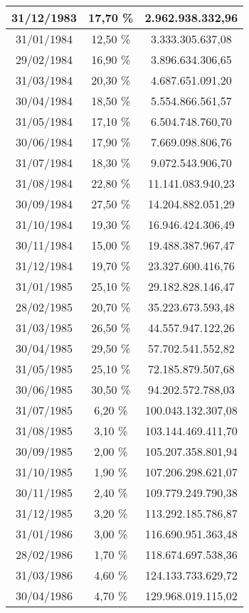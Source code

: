 \begin{center}
\begin{longtable}{|c|c|c|}
31/12/1983 & 17,70 \% & 2.962.938.332,96  \\ \hline
31/01/1984 & 12,50 \% & 3.333.305.637,08  \\ \hline
29/02/1984 & 16,90 \% & 3.896.634.306,65  \\ \hline
31/03/1984 & 20,30 \% & 4.687.651.091,20  \\ \hline
30/04/1984 & 18,50 \% & 5.554.866.561,57  \\ \hline
31/05/1984 & 17,10 \% & 6.504.748.760,70  \\ \hline
30/06/1984 & 17,90 \% & 7.669.098.806,76  \\ \hline
31/07/1984 & 18,30 \% & 9.072.543.906,70  \\ \hline
31/08/1984 & 22,80 \% & 11.141.083.940,23  \\ \hline
30/09/1984 & 27,50 \% & 14.204.882.051,29  \\ \hline
31/10/1984 & 19,30 \% & 16.946.424.306,49  \\ \hline
30/11/1984 & 15,00 \% & 19.488.387.967,47  \\ \hline
31/12/1984 & 19,70 \% & 23.327.600.416,76  \\ \hline
31/01/1985 & 25,10 \% & 29.182.828.146,47  \\ \hline
28/02/1985 & 20,70 \% & 35.223.673.593,48  \\ \hline
31/03/1985 & 26,50 \% & 44.557.947.122,26  \\ \hline
30/04/1985 & 29,50 \% & 57.702.541.552,82  \\ \hline
31/05/1985 & 25,10 \% & 72.185.879.507,68  \\ \hline
30/06/1985 & 30,50 \% & 94.202.572.788,03  \\ \hline
31/07/1985 & 6,20 \% & 100.043.132.307,08  \\ \hline
31/08/1985 & 3,10 \% & 103.144.469.411,70  \\ \hline
30/09/1985 & 2,00 \% & 105.207.358.801,94  \\ \hline
31/10/1985 & 1,90 \% & 107.206.298.621,07  \\ \hline
30/11/1985 & 2,40 \% & 109.779.249.790,38  \\ \hline
31/12/1985 & 3,20 \% & 113.292.185.786,87  \\ \hline
31/01/1986 & 3,00 \% & 116.690.951.363,48  \\ \hline
28/02/1986 & 1,70 \% & 118.674.697.538,36  \\ \hline
31/03/1986 & 4,60 \% & 124.133.733.629,72  \\ \hline
30/04/1986 & 4,70 \% & 129.968.019.115,02  \\ \hline

\end{longtable}
\end{center}
